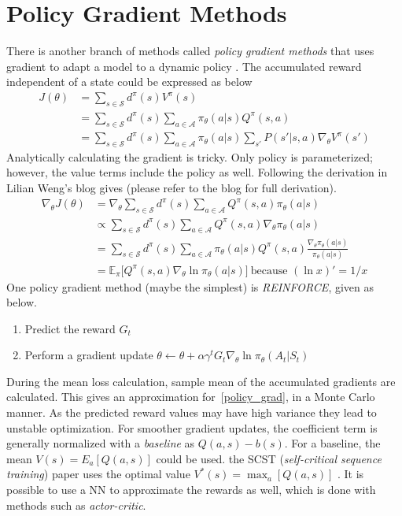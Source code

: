 \documentclass{book}
\numberwithin{equation}{subsection}
\begin{document}
\section{Policy Gradient Methods}
There is another branch of methods called \textit{policy gradient methods} that uses gradient to adapt a model to a dynamic policy \cite{lapan_deep_2020}. The accumulated reward independent of a state could be expressed as below
\begin{align}
    J(\theta) 
&= \sum_{s \in \mathcal{S}} d^\pi(s) V^\pi(s) \\
&= \sum_{s \in \mathcal{S}} d^\pi(s) \sum_{a \in \mathcal{A}} \pi_\theta(a \vert s) Q^\pi(s, a)\\
&= \sum_{s \in \mathcal{S}} d^\pi(s)\sum_{a \in \mathcal{A}} \pi_\theta(a \vert s) \sum_{s'} P(s' \vert s,a) \nabla_\theta V^\pi(s')
\end{align}
Analytically calculating the gradient is tricky. Only policy is parameterized; however, the value terms include the policy as well. Following the derivation in Lilian Weng's blog gives (please refer to the blog for full derivation).
\begin{align}
\nabla_\theta J(\theta) 
&= \nabla_\theta \sum_{s \in \mathcal{S}} d^\pi(s) \sum_{a \in \mathcal{A}} Q^\pi(s, a) \pi_\theta(a \vert s) \\
&\propto \sum_{s \in \mathcal{S}} d^\pi(s) \sum_{a \in \mathcal{A}} Q^\pi(s, a) \nabla_\theta \pi_\theta(a \vert s) \\
&= \sum_{s \in \mathcal{S}} d^\pi(s) \sum_{a \in \mathcal{A}} \pi_\theta(a \vert s) Q^\pi(s, a) \frac{\nabla_\theta \pi_\theta(a \vert s)}{\pi_\theta(a \vert s)} \\
&= \mathbb{E}_\pi \big[Q^\pi(s, a) \nabla_\theta \ln \pi_\theta(a \vert s)\big]\ \scriptstyle{\text{because } (\ln x)' = 1/x} \label{policy_grad} 
\end{align}
One policy gradient method (maybe the simplest) is \textit{REINFORCE}, given as below.
\begin{enumerate}
    \item Predict the reward $G_t$
    \item Perform a gradient update $\theta \leftarrow \theta + \alpha \gamma^t G_t \nabla_\theta \ln \pi_\theta(A_t \vert S_t)$\ \cite{weng_policy_2018}
\end{enumerate}
During the mean loss calculation, sample mean of the accumulated gradients are calculated. This gives an approximation for~\ref{policy_grad}, in a Monte Carlo manner. As the predicted reward values may have high variance they lead to unstable optimization. For smoother gradient updates, the coefficient term is generally normalized with a \textit{baseline} as $Q(a,s)-b(s)$. For a baseline, the mean $V(s) = E_a[Q(a,s)]$ could be used. the SCST (\textit{self-critical sequence training}) paper uses the optimal value $V^*(s) = \max_a[Q(a,s)]$ \cite{rennie_self-critical_2017}. It is possible to use a NN to approximate the rewards as well, which is done with methods such as \textit{actor-critic}. 
\end{document}
